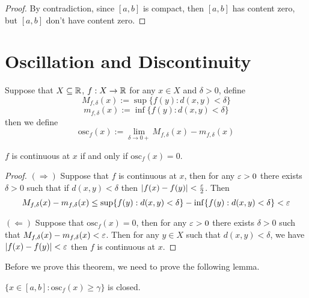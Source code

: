 \begin{proof}
  By contradiction, since $[a, b]$ is compact, then $[a, b]$ has content zero, 
  but $[a, b]$ don't have content zero.
\end{proof}

\section{Oscillation and Discontinuity}

\begin{definition}
  Suppose that $X \subseteq \mathbb R$, $f: X \to \mathbb R$ for any $x \in X$ and $\delta > 0$, define
  \[M_{f, \delta}(x) := \sup\{f(y) : d(x, y) < \delta\}\]
  \[m_{f, \delta}(x) := \inf\{f(y) : d(x, y) < \delta\}\]
then we define 
\[\mathrm{osc}_f(x) := \lim_{\delta\to0+} M_{f, \delta}(x) - m_{f, \delta}(x)\]
\end{definition}

\begin{lemma}
  $f$ is continuous at $x$ if and only if $\mathrm{osc}_f(x) = 0$.
\end{lemma}

\begin{proof}
  $(\Rightarrow)$ Suppose that $f$ is continuous at $x$, then for any $\varepsilon > 0$ there exists $\delta > 0$ such that
  if $d(x, y) < \delta$ then $|f(x) - f(y)| < \frac{\varepsilon}2$. Then
  \[M_{f, \delta}(x) - m_{f, \delta}(x) \le \sup\{f(y) : d(x, y) < \delta\} - \inf\{f(y) : d(x, y) < \delta\} < \varepsilon\]

  $(\Leftarrow)$ Suppose that $\mathrm{osc}_f(x) = 0$, then for any $\varepsilon > 0$ there exists $\delta > 0$ such that
  $M_{f, \delta}(x) - m_{f, \delta}(x) < \varepsilon$. Then for any $y \in X$ such that $d(x, y) < \delta$, we have
  $|f(x) - f(y)| < \varepsilon$ then $f$ is continuous at $x$.
\end{proof}



Before we prove this theorem, we need to prove the following lemma.

\begin{lemma}
  $\{x \in [a, b]: \mathrm{osc}_f(x) \ge \gamma\}$ is closed.
\end{lemma}

